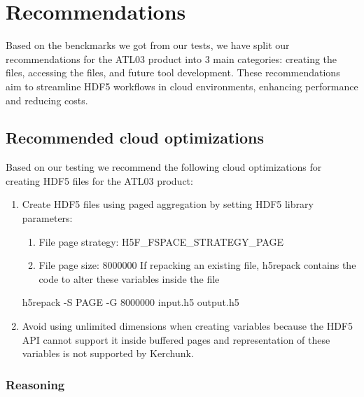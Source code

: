 \documentclass[
]{agujournal2019}
\newenvironment{Shaded}{\begin{snugshade}}{\end{snugshade}}
\newcommand{\AttributeTok}[1]{\textcolor[rgb]{0.40,0.45,0.13}{#1}}
\newcommand{\ExtensionTok}[1]{\textcolor[rgb]{0.00,0.23,0.31}{#1}}
\newcommand{\NormalTok}[1]{\textcolor[rgb]{0.00,0.23,0.31}{#1}}
\providecommand{\tightlist}{%
  \setlength{\itemsep}{0pt}\setlength{\parskip}{0pt}}
\begin{document}
\section{Recommendations}\label{recommendations}

Based on the benckmarks we got from our tests, we have split our
recommendations for the ATL03 product into 3 main categories: creating
the files, accessing the files, and future tool development. These
recommendations aim to streamline HDF5 workflows in cloud environments,
enhancing performance and reducing costs.

\subsection{Recommended cloud
optimizations}\label{recommended-cloud-optimizations}

Based on our testing we recommend the following cloud optimizations for
creating HDF5 files for the ATL03 product:

\begin{enumerate}
\def\labelenumi{\arabic{enumi}.}
\tightlist
\item
  Create HDF5 files using paged aggregation by setting HDF5 library
  parameters:

  \begin{enumerate}
  \def\labelenumii{\alph{enumii}.}
  \tightlist
  \item
    File page strategy: H5F\_FSPACE\_STRATEGY\_PAGE
  \item
    File page size: 8000000 If repacking an existing file, h5repack
    contains the code to alter these variables inside the file
  \end{enumerate}

\begin{Shaded}
\begin{Highlighting}[]
 \ExtensionTok{h5repack} \AttributeTok{{-}S}\NormalTok{ PAGE }\AttributeTok{{-}G}\NormalTok{ 8000000 input.h5 output.h5}
\end{Highlighting}
\end{Shaded}
\item
  Avoid using unlimited dimensions when creating variables because the
  HDF5 API cannot support it inside buffered pages and representation of
  these variables is not supported by Kerchunk.
\end{enumerate}

\subsubsection{Reasoning}\label{reasoning}
\end{document}
